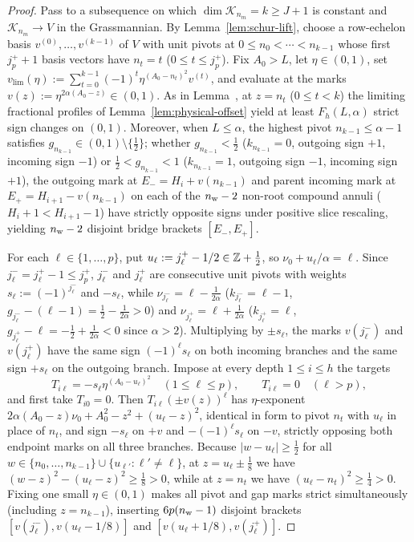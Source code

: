 \begin{proof}
Pass to a subsequence on which $\dim\mathcal{K}_{n_m}=k\ge J+1$ is constant and $\mathcal{K}_{n_m}\to V$ in the Grassmannian. By Lemma~\ref{lem:schur-lift}, choose a row-echelon basis $v^{(0)},\dots,v^{(k-1)}$ of $V$ with unit pivots at $0\le n_0<\cdots<n_{k-1}$ whose first $j_p^++1$ basis vectors have $n_t=t$ ($0\le t\le j_p^+$). Fix $A_0>L$, let $\eta\in(0,1)$, set $v_{\lim}(\eta):=\sum_{t=0}^{k-1}(-1)^t\eta^{(A_0-n_t)^2}v^{(t)}$, and evaluate at the marks $v(z):=\eta^{2\alpha(A_0-z)}\in(0,1)$. As in Lemma~, at $z=n_t$ ($0\le t<k$) the limiting fractional profiles of Lemma~\ref{lem:physical-offset} yield at least $F_h(L,\alpha)$ strict sign changes on $(0,1)$. Moreover, when $L\le\alpha$, the highest pivot $n_{k-1}\le\alpha-1$ satisfies $g_{n_{k-1}}\in(0,1)\setminus\{\frac{1}{2}\}$; whether $g_{n_{k-1}}<\frac{1}{2}$ ($k_{n_{k-1}}=0$, outgoing sign $+1$, incoming sign $-1$) or $\frac{1}{2}<g_{n_{k-1}}<1$ ($k_{n_{k-1}}=1$, outgoing sign $-1$, incoming sign $+1$), the outgoing mark at $E_-=H_i+v(n_{k-1})$ and parent incoming mark at $E_+=H_{i+1}-v(n_{k-1})$ on each of the $n_{\rm w}-2$ non-root compound annuli ($H_i+1<H_{i+1}-1$) have strictly opposite signs under positive slice rescaling, yielding $n_{\rm w}-2$ disjoint bridge brackets $[E_-,E_+]$.

For each $\ell\in\{1,\dots,p\}$, put $u_\ell:=j_\ell^+-1/2\in\mathbb{Z}+\frac{1}{2}$, so $\nu_0+u_\ell/\alpha=\ell$. Since $j_\ell^-=j_\ell^+-1\le j_p^+$, $j_\ell^-$ and $j_\ell^+$ are consecutive unit pivots with weights $s_\ell:=(-1)^{j_\ell^-}$ and $-s_\ell$, while $\nu_{j_\ell^-}=\ell-\frac{1}{2\alpha}$ ($k_{j_\ell^-}=\ell-1$, $g_{j_\ell^-}-(\ell-1)=\frac{1}{2}-\frac{1}{2\alpha}>0$) and $\nu_{j_\ell^+}=\ell+\frac{1}{2\alpha}$ ($k_{j_\ell^+}=\ell$, $g_{j_\ell^+}-\ell=-\frac{1}{2}+\frac{1}{2\alpha}<0$ since $\alpha>2$). Multiplying by $\pm s_\ell$, the marks $v(j_\ell^-)$ and $v(j_\ell^+)$ have the same sign $(-1)^\ell s_\ell$ on both incoming branches and the same sign $+s_\ell$ on the outgoing branch. Impose at every depth $1\le i\le h$ the targets
\[
  T_{i\ell} = -s_\ell \eta^{(A_0-u_\ell)^2} \quad (1\le\ell\le p), \qquad T_{i\ell} = 0 \quad (\ell>p),
\]
and first take $T_{i0}=0$. Then $T_{i\ell}(\pm v(z))^\ell$ has $\eta$-exponent $2\alpha(A_0-z)\nu_0+A_0^2-z^2+(u_\ell-z)^2$, identical in form to pivot $n_t$ with $u_\ell$ in place of $n_t$, and sign $-s_\ell$ on $+v$ and $-(-1)^\ell s_\ell$ on $-v$, strictly opposing both endpoint marks on all three branches. Because $|w-u_\ell|\ge\frac{1}{2}$ for all $w\in\{n_0,\dots,n_{k-1}\}\cup\{u_{\ell'}:\ell'\ne\ell\}$, at $z=u_\ell\pm\frac{1}{8}$ we have $(w-z)^2-(u_\ell-z)^2\ge\frac{1}{8}>0$, while at $z=n_t$ we have $(u_\ell-n_t)^2\ge\frac{1}{4}>0$. Fixing one small $\eta\in(0,1)$ makes all pivot and gap marks strict simultaneously (including $z=n_{k-1}$), inserting $6p(n_{\rm w}-1)$ disjoint brackets $[v(j_\ell^-),v(u_\ell-1/8)]$ and $[v(u_\ell+1/8),v(j_\ell^+)]$.


\end{proof}
